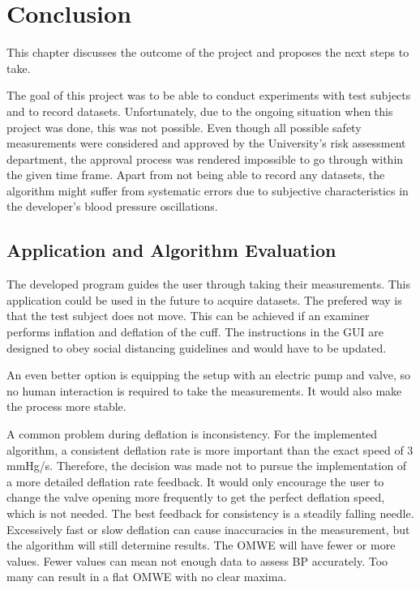 \chapter{Conclusion}\label{cp:concl} %

This chapter discusses the outcome of the project and proposes the next steps to take.

The goal of this project was to be able to conduct experiments with test subjects and to record datasets. Unfortunately, due to the ongoing situation when this project was done, this was not possible. Even though all possible safety measurements were considered and approved by the University's risk assessment department, the approval process was rendered impossible to go through within the given time frame. Apart from not being able to record any datasets, the algorithm might suffer from systematic errors due to subjective characteristics in the developer's blood pressure oscillations. 


\section{Application and Algorithm Evaluation}

The developed program guides the user through taking their measurements. This application could be used in the future to acquire datasets. The prefered way is that the test subject does not move. This can be achieved if an examiner performs inflation and deflation of the cuff. The instructions in the GUI are designed to obey social distancing guidelines and would have to be updated. 

An even better option is equipping the setup with an electric pump and valve, so no human interaction is required to take the measurements. It would also make the process more stable. 

A common problem during deflation is inconsistency. For the implemented algorithm, a consistent deflation rate is more important than the exact speed of 3 mmHg/s. Therefore, the decision was made not to pursue the implementation of a more detailed deflation rate feedback. It would only encourage the user to change the valve opening more frequently to get the perfect deflation speed, which is not needed. The best feedback for consistency is a steadily falling needle. Excessively fast or slow deflation can cause inaccuracies in the measurement, but the algorithm will still determine results. The OMWE will have fewer or more values. Fewer values can mean not enough data to assess BP accurately. Too many can result in a flat OMWE with no clear maxima.

